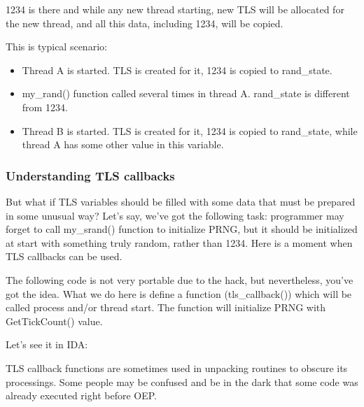 1234 is there and while any new thread starting, new TLS will be allocated for the new thread, and all this
data, including 1234, will be copied.

This is typical scenario:

\begin{itemize}
\item Thread A is started. TLS is created for it, 1234 is copied to rand\_state.
\item my\_rand() function called several times in thread A. rand\_state is different from 1234.
\item Thread B is started. TLS is created for it, 1234 is copied to rand\_state, 
while thread A has some other value in this variable.
\end{itemize}

\subsubsection{Understanding \ac{TLS} callbacks}

But what if TLS variables should be filled with some data that must be prepared in some unusual way?
Let's say, we've got the following task:
programmer may forget to call my\_srand() function to initialize \ac{PRNG}, but it should be initialized
at start with something truly random, rather than 1234.
Here is a moment when \ac{TLS} callbacks can be used.

The following code is not very portable due to the hack, but nevertheless, you've got the idea.
What we do here is define a function (tls\_callback()) which will be called  process and/or thread 
start.
The function will initialize \ac{PRNG} with GetTickCount() value.



Let's see it in IDA:



TLS callback functions are sometimes used in unpacking routines to obscure its processings.
Some people may be confused and be in the dark that some code was already executed right before \ac{OEP}.
